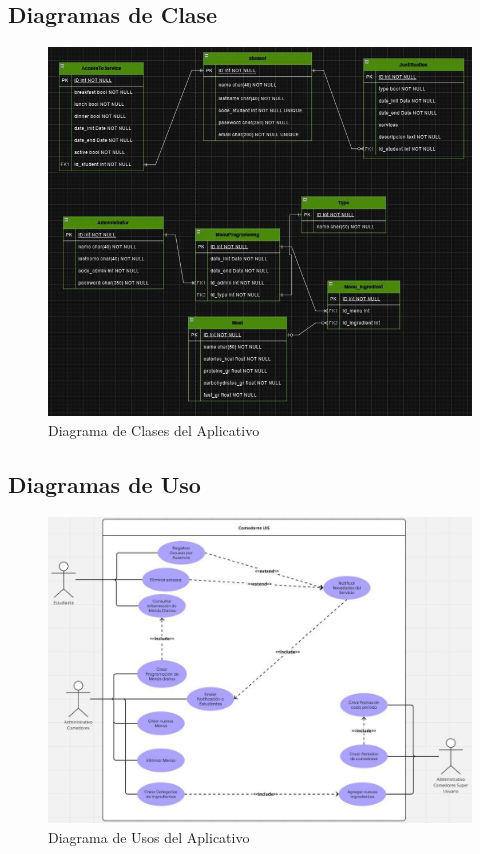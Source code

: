 \documentclass[stu, 12pt, letterpaper, donotrepeattitle, floatsintext, natbib]{apa7}
\begin{document}
\newpage

\subsection{Diagramas de Clase}

\begin{figure}[H]
	\caption[]{Diagrama de Clases del Aplicativo}
	\label{Diagrama de Clases del Aplicativo}
	\includegraphics[width=1\linewidth]{Diagramas/Diagrama de Clases.jpg}
\end{figure}

\subsection{Diagramas de Uso}

\begin{figure}[H]
	\caption[]{Diagrama de Usos del Aplicativo}
	\label{Diagrama de Usos del Aplicativo}
	\includegraphics[width=1\linewidth]{Diagramas/Diagrama de Usos.jpg}
\end{figure}
\end{document}
